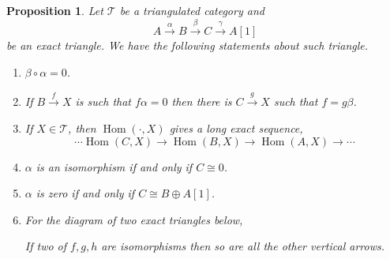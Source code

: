 \documentclass[10pt]{article}
\numberwithin{equation}{section}
\newtheorem{proposition}{Proposition}[section]
\DeclareMathOperator{\Hom}{Hom}
\newcommand{\sT}[0]{\mathscr{T}}
\begin{document}
\begin{proposition}
    Let $\sT$ be a triangulated category and 
    \begin{equation*}
        A\stackrel{\alpha}{\to}B\stackrel{\beta}{\to}C\stackrel{\gamma}{\to} A[1]
    \end{equation*} 
    be an exact triangle. We have the following statements about such triangle.
    \begin{enumerate}[1.]
        \item $\beta\circ\alpha = 0$.
        \item If $B\stackrel{f}{\to}X$ is such that $f\alpha = 0$ then there is $C\stackrel{g}{\to}X$ such that $f=g\beta$.
        \item If $X\in\sT$, then $\Hom(\cdot,X)$ gives a long exact sequence,
        \begin{equation*}
            \cdots\Hom(C,X)\to\Hom(B,X)\to\Hom(A,X)\to\cdots
        \end{equation*}
        \item $\alpha$ is an isomorphism if and only if $C\cong 0$.
        \item $\alpha$ is zero if and only if $C\cong B\oplus A[1]$.
        \item For the diagram of two exact triangles below,
        \begin{center}
        \end{center}
        If two of $f,g,h$ are isomorphisms then so are all the other vertical arrows.
    \end{enumerate}
\end{proposition}
\end{document}
